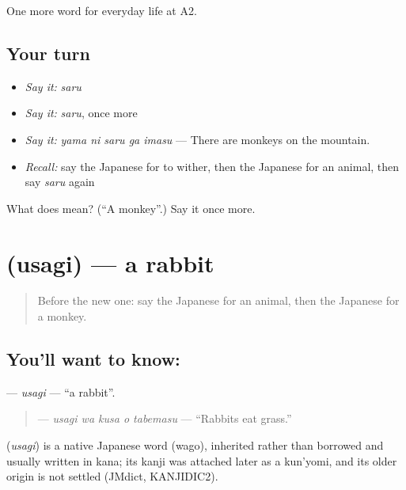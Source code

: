 \begin{grammarlens}[title={What you've built}]
One more word for everyday life at A2.
\end{grammarlens}

\subsection*{Your turn}
\begin{itemize}
\raggedright
  \item \emph{Say it:} \emph{saru}
  \item \emph{Say it:} \emph{saru}, once more
  \item \emph{Say it:} \emph{yama ni saru ga imasu} — There are monkeys on the mountain.
  \item \emph{Recall:} say the Japanese for to wither, then the Japanese for an animal, then say \emph{saru} again
\end{itemize}

\begin{tcolorbox}[breakable,colback=teal!4,colframe=teal!35!black,title={Before you move on}]
What does  mean? (\textquotedblleft{}A monkey\textquotedblright{}.) Say it once more.
\end{tcolorbox}
\section[\texorpdfstring{\ja{うさぎ} (usagi)}{うさぎ (usagi)}]{ (usagi) — a rabbit}

\label{lesson:JA-C211-usagi}



\begin{quote}
Before the new one: say the Japanese for an animal, then the Japanese for a monkey.
\end{quote}

\subsection*{You'll want to know: }
\textbf{} — \emph{usagi} — \textquotedblleft{}a rabbit\textquotedblright{}.

\begin{quote}
\textbf{  } — \emph{usagi wa kusa o tabemasu} — \textquotedblleft{}Rabbits eat grass.\textquotedblright{}
\end{quote}

\begin{cousinweb}
\textbf{} (\emph{usagi}) is a native Japanese word (wago), inherited rather than borrowed and usually written in kana; its kanji was attached later as a kun'yomi, and its older origin is not settled (JMdict, KANJIDIC2).
\end{cousinweb}

